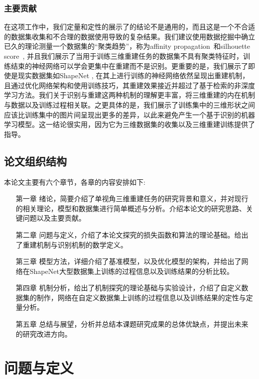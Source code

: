 \documentclass[bachelor, nocolorlinks, printoneside]{seuthesis} %
\begin{document}
\begin{Main}
\subsection{主要贡献}
在这项工作中，我们定量和定性的展示了\cite{tatarchenko2019single}的结论不是通用的，而且这是一个不合适的数据集收集和不合理的数据使用导致的复杂结果。我们建议使用数据挖掘中确立已久的理论测量一个数据集的“聚类趋势”，称为affinity propagation~\cite{wang2008adaptive}和silhouette score~\cite{van2015using}, 并且我们展示了当用于训练三维重建任务的数据集不具有聚类特征时，训练结束的神经网络可以学会更集中在重建而不是识别。更重要的是，我们展示了即使是现实数据集如ShapeNet \cite{chang2015shapenet}, 在其上进行训练的神经网络依然呈现出重建机制，且通过优化网络架构和使用训练技巧，其重建效果接近并超过了基于检索的非深度学习方法。我们关于识别与重建这两种机制的理解更丰富，将三维重建的内在机制与数据以及训练过程相关联。之更具体的是，我们展示了训练集中的三维形状之间应该比训练集中的图片间呈现出更多的差异，以此来避免产生一个基于识别的机器学习模型。这一结论很实用，因为它为三维数据集的收集以及三维重建训练提供了指导。
\section{论文组织结构}
本论文主要有六个章节，各章的内容安排如下:
\begin{itemize}[\hspace{2cm}]
    \item[第一章] 绪论，简要介绍了单视角三维重建任务的研究背景和意义，并对现行的相关理论，模型和数据集进行简单概述与分析。介绍本论文的研究思路、关键问题以及主要贡献。
    \item[第二章] 问题与定义，介绍了本论文探究的损失函数和算法的理论基础。给出了重建机制与识别机制的数学定义。
    \item[第三章] 模型方法，详细介绍了基准模型，以及优化模型的架构，并给出了网络在ShapeNet大型数据集上训练的过程信息以及训练结果的分析比较。
    \item[第四章] 机制分析，给出了机制探究的理论基础与实验设计，介绍了自定义数据集的制作，网络在自定义数据集上训练的过程信息以及训练结果的定性与定量分析。
    \item[第五章] 总结与展望，分析并总结本课题研究成果的总体优缺点，并提出未来的研究改进方向。
\end{itemize}
\chapter{问题与定义}

\end{Main}
\end{document}
